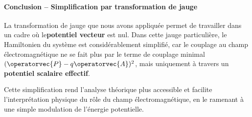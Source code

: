 \paragraph{Conclusion – Simplification par transformation de jauge}
\bigskip
La transformation de jauge que nous avons appliquée permet de travailler dans un cadre où le{\bf  potentiel vecteur} est nul. Dans cette jauge particulière, le Hamiltonien du système est considérablement simplifié, car le couplage au champ électromagnétique ne se fait plus par le terme de couplage minimal \((\operatorvec{P} - q \operatorvec{A})^2\), mais uniquement à travers un {\bf potentiel scalaire effectif}.

Cette simplification rend l’analyse théorique plus accessible et facilite l’interprétation physique du rôle du champ électromagnétique, en le ramenant à une simple modulation de l’énergie potentielle.
